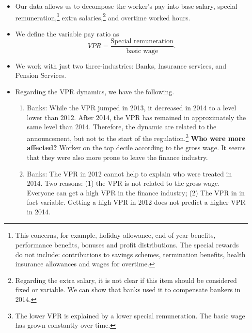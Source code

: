 \documentclass[12pt]{article}
\begin{document}
	\begin{itemize}
		\item Our data allows us to decompose the worker's pay into base salary, special remuneration,\footnote{This concerns, for example, holiday allowance, end-of-year benefits, performance benefits, bonuses and profit distributions. The special rewards do not include: contributions to savings schemes, termination benefits, health insurance allowances and wages for overtime.} extra salaries,\footnote{Regarding the extra salary, it is not clear if this item should be considered fixed or variable. We can show that banks used it to compensate bankers in 2014.} and overtime worked hours. 
		\item We define the variable pay ratio as
		\begin{equation}
			VPR = \frac{\text{Special remuneration}}{\text{basic wage}}.
		\end{equation}
		\item We work with just two three-industries: Banks, Insurance services, and Pension Services.  
		\item Regarding the VPR dynamics, we have the following. 
		\begin{enumerate}
			\item Banks: While the VPR jumped in 2013, it decreased in 2014 to a level lower than 2012. After 2014, the VPR has remained in approximately the same level than 2014. Therefore, the dynamic are related to the announcement, but not to the start of the regulation.\footnote{The lower VPR is explained by a lower special remuneration. The basic wage has grown constantly over time. } \textbf{Who were more affected?}  Worker on the top decile according to the gross wage. It seems that they were also more prone to leave the finance industry. 
			\item Banks: The VPR in 2012 cannot help to explain who were treated in 2014. Two reasons: (1) the VPR is not related to the gross wage. Everyone can get a high VPR in the finance industry; (2) The VPR in in fact variable. Getting a high VPR in 2012 does not predict a higher VPR in 2014. 
			

\end{enumerate}
\end{itemize}
\end{document}
